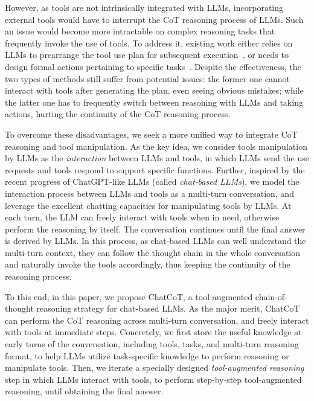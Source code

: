 However, as tools are not intrinsically integrated with LLMs, incorporating external tools would have to interrupt the CoT reasoning process of LLMs.  
Such an issue would become more intractable on complex reasoning tasks that frequently invoke the use of tools.  
To address it, existing work either relies on LLMs to prearrange the tool use plan for subsequent execution~\cite{Least-to-Most, Self-planning}, or needs to design formal actions pertaining to specific tasks~\cite{Sccessive-Prompting,dsp,jiang2023structgpt}. 
Despite the effectiveness, the two types of methods still suffer from potential issues: the former one cannot interact with tools after generating the plan,  even seeing obvious mistakes; while the latter one has to frequently switch between reasoning with LLMs and taking actions, hurting the continuity of the CoT reasoning process.

To overcome these disadvantages, we seek a more unified way to integrate CoT reasoning and tool manipulation. 
As the key idea, we consider tools manipulation by LLMs as the \emph{interaction} between LLMs and tools, in which LLMs send the use requests and tools respond to support specific functions.  
Further, inspired by the recent progress of ChatGPT-like LLMs (called  \emph{chat-based  LLMs}), we model the interaction process between LLMs and tools as a multi-turn conversation, and leverage the excellent chatting capacities for manipulating tools by LLMs. 
At each turn, the LLM can freely interact with tools when in need, otherwise perform the reasoning by itself. 
The conversation continues until the final answer is derived by LLMs. 
In this process, as chat-based LLMs can well understand the multi-turn context, they can follow the thought chain in the whole conversation and naturally invoke the tools accordingly, thus keeping the continuity of the reasoning process.

To this end, in this paper, we propose ChatCoT, a tool-augmented chain-of-thought reasoning strategy for chat-based LLMs. As the major merit, 
ChatCoT can perform the CoT reasoning across multi-turn conversation, and freely interact with tools at immediate steps.
Concretely, we first store the useful knowledge at early turns of the conversation, including tools, tasks, and multi-turn reasoning format, to help LLMs utilize task-specific knowledge to perform reasoning or manipulate tools.
Then, we iterate a specially designed  \emph{tool-augmented reasoning} step in which LLMs interact with tools, to perform step-by-step tool-augmented reasoning, until obtaining the final answer.

